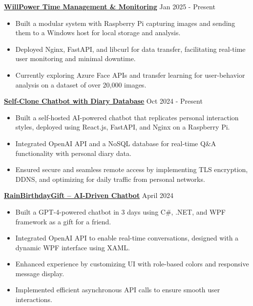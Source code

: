 \documentclass[a4paper,10pt]{article}
\begin{document}
\vspace{0.3cm}
\noindent\href{https://github.com/Ken-2511/WillPower}{\uline{
\textbf{WillPower \textbar{} Time Management \& Monitoring}}} \hfill Jan 2025 - Present
\begin{itemize}[leftmargin=0.2in]
    \item Built a modular system with Raspberry Pi capturing images and sending them to a Windows host for local storage and analysis.
    \item Deployed Nginx, FastAPI, and libcurl for data transfer, facilitating real-time user monitoring and minimal downtime.
    \item Currently exploring Azure Face APIs and transfer learning for user-behavior analysis on a dataset of over 20,000 images.
\end{itemize}

\vspace{0.3cm}
\noindent\href{https://chengyongkang.me/chat}{\uline{
\textbf{Self-Clone Chatbot with Diary Database}}} \hfill Oct 2024 - Present
\begin{itemize}[leftmargin=0.2in]
    \item Built a self-hosted AI-powered chatbot that replicates personal interaction styles, deployed using React.js, FastAPI, and Nginx on a Raspberry Pi.
    \item Integrated OpenAI API and a NoSQL database for real-time Q\&A functionality with personal diary data.
    \item Ensured secure and seamless remote access by implementing TLS encryption, DDNS, and optimizing for daily traffic from personal networks.
\end{itemize}

\vspace{0.3cm}
\noindent\href{https://github.com/Ken-2511/RainBirthdayGift}{\uline{
\textbf{RainBirthdayGift – AI-Driven Chatbot}}} \hfill April 2024
\begin{itemize}[leftmargin=0.2in]
    \item Built a GPT-4-powered chatbot in 3 days using C\#, .NET, and WPF framework as a gift for a friend.
    \item Integrated OpenAI API to enable real-time conversations, designed with a dynamic WPF interface using XAML.
    \item Enhanced experience by customizing UI with role-based colors and responsive message display.
    \item Implemented efficient asynchronous API calls to ensure smooth user interactions.
\end{itemize}
\end{document}
